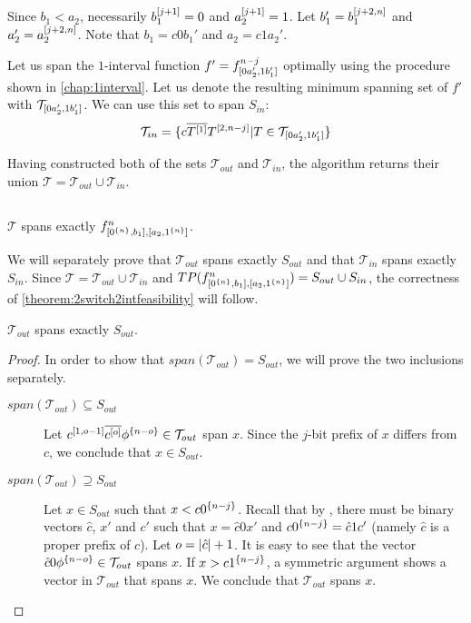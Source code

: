 \begin{description}
Since $b_1 < a_2$,
necessarily $b_1^{[j+1]} = 0$ and $a_2^{[j+1]} = 1$.
Let $b_1' = b_1^{[j+2, n]}$
and $a_2' = a_2^{[j+2, n]}$.
Note that $b_1 = c 0 b_1'$ and $a_2 = c 1 a_2'$.

Let us
span the $1$-interval function
$f' = f^{n-j}_{[0 a_2', 1 b_1']}$
optimally using the procedure shown in \cref{chap:1interval}.
Let us denote the resulting minimum spanning set of $f'$
with $\mathcal{T}_{[0 a_2', 1 b_1']}$.
We can use this set to span $S_{in}$:
$$
\mathcal{T}_{in} =
\{c \overline{T^{[1]}} T^{[2, n-j]}
| T \in \mathcal{T}_{[0 a_2', 1 b_1']}\}
$$

Having constructed both of the sets
$\mathcal{T}_{out}$ and $\mathcal{T}_{in}$,
the algorithm returns their union
$\mathcal{T} = \mathcal{T}_{out} \cup \mathcal{T}_{in}$.
\end{description}

\subsection{\titlefeasibility}

\begin{theorem}
\label{theorem:2switch2intfeasibility}
$\mathcal{T}$ spans exactly $f^{n}_{[0^{\{n\}}, b_1], [a_2, 1^{\{n\}}]}$.
\end{theorem}

We will separately prove that $\mathcal{T}_{out}$ spans exactly $S_{out}$
and that $\mathcal{T}_{in}$ spans exactly $S_{in}$.
Since $\mathcal{T} = \mathcal{T}_{out} \cup \mathcal{T}_{in}$
and $TP(f^{n}_{[0^{\{n\}}, b_1], [a_2, 1^{\{n\}}]}) = S_{out} \cup S_{in}$,
the correctness of
\cref{theorem:2switch2intfeasibility} will follow.

\begin{lemma}
$\mathcal{T}_{out}$ spans exactly $S_{out}$.
\end{lemma}

\begin{proof}
In order to show that
$span(\mathcal{T}_{out}) = S_{out}$,
we will prove the two inclusions separately.

\begin{description}
\item[$span(\mathcal{T}_{out}) \subseteq S_{out}$]
Let $c^{[1, o-1]} \overline{c^{[o]}} \phi^{\{n-o\}}
\in \mathcal{T}_{out}$
span $x$.
Since the $j$-bit prefix of $x$ differs from $c$,
we conclude that $x \in S_{out}$.

\item[$span(\mathcal{T}_{out}) \supseteq S_{out}$]
Let $x \in S_{out}$ such that $x < c 0^{\{n-j\}}$.
Recall that by ,
there must be binary vectors $\hat{c}$, $x'$ and $c'$
such that $x = \hat{c} 0 x'$
and $c 0^{\{n-j\}} = \hat{c} 1 c'$
(namely $\hat{c}$ is a proper prefix of $c$).
Let $o = \lvert\hat{c}\rvert + 1$.
It is easy to see that the vector
$\hat{c} 0 \phi^{\{n-o\}} \in \mathcal{T}_{out}$
spans $x$.
If $x > c 1^{\{n-j\}}$,
a symmetric argument shows a vector in $\mathcal{T}_{out}$
that spans $x$.
We conclude that $\mathcal{T}_{out}$ spans $x$.
\end{description}
\end{proof}

